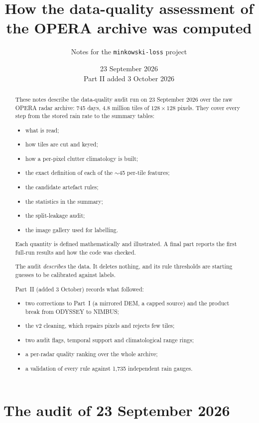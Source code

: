\documentclass[11pt,a4paper]{article}
\title{How the data-quality assessment of the OPERA archive was computed}
\author{Notes for the \texttt{minkowski-loss} project}
\date{23 September 2026 \\ Part II added 3 October 2026}
\theoremstyle{definition}
\theoremstyle{remark}
\newcommand{\1}{\mathbf{1}}
\begin{document}
\maketitle

\begin{abstract}
These notes describe the data-quality audit run on 23 September 2026 over the raw OPERA
radar archive: 745 days, 4.8 million tiles of $128\times128$ pixels. They cover every step
from the stored rain rate to the summary tables:
\begin{itemize}[nosep]
\item what is read;
\item how tiles are cut and keyed;
\item how a per-pixel clutter climatology is built;
\item the exact definition of each of the $\sim$45 per-tile features;
\item the candidate artefact rules;
\item the statistics in the summary;
\item the split-leakage audit;
\item the image gallery used for labelling.
\end{itemize}
Each quantity is defined mathematically and illustrated. A final part reports the first
full-run results and how the code was checked.

The audit \emph{describes} the data. It deletes nothing, and its rule thresholds are
starting guesses to be calibrated against labels.

Part~II (added 3 October) records what followed:
\begin{itemize}[nosep]
\item two corrections to Part~I (a mirrored DEM, a capped source) and the product break
  from ODYSSEY to NIMBUS;
\item the v2 cleaning, which repairs pixels and rejects few tiles;
\item two audit flags, temporal support and climatological range rings;
\item a per-radar quality ranking over the whole archive;
\item a validation of every rule against 1,735 independent rain gauges.
\end{itemize}
\end{abstract}

\tableofcontents

\part{The audit of 23 September 2026}
\end{document}
